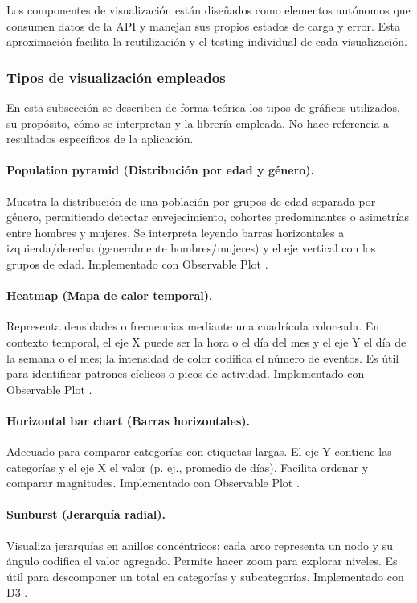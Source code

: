 Los componentes de visualización están diseñados como elementos autónomos que consumen datos de la API y manejan sus propios estados de carga y error. Esta aproximación facilita la reutilización y el testing individual de cada visualización.




\subsubsection{Tipos de visualización empleados}
En esta subsección se describen de forma teórica los tipos de gráficos utilizados, su propósito, cómo se interpretan y la librería empleada. No hace referencia a resultados específicos de la aplicación.

\paragraph{Population pyramid (Distribución por edad y género).} Muestra la distribución de una población por grupos de edad separada por género, permitiendo detectar envejecimiento, cohortes predominantes o asimetrías entre hombres y mujeres. Se interpreta leyendo barras horizontales a izquierda/derecha (generalmente hombres/mujeres) y el eje vertical con los grupos de edad. Implementado con Observable Plot \cite{populationPyramid,observableplot}.

\paragraph{Heatmap (Mapa de calor temporal).} Representa densidades o frecuencias mediante una cuadrícula coloreada. En contexto temporal, el eje X puede ser la hora o el día del mes y el eje Y el día de la semana o el mes; la intensidad de color codifica el número de eventos. Es útil para identificar patrones cíclicos o picos de actividad. Implementado con Observable Plot \cite{heatmap,observableplot}.

\paragraph{Horizontal bar chart (Barras horizontales).} Adecuado para comparar categorías con etiquetas largas. El eje Y contiene las categorías y el eje X el valor (p. ej., promedio de días). Facilita ordenar y comparar magnitudes. Implementado con Observable Plot \cite{hbarchart,observableplot}.

\paragraph{Sunburst (Jerarquía radial).} Visualiza jerarquías en anillos concéntricos; cada arco representa un nodo y su ángulo codifica el valor agregado. Permite hacer zoom para explorar niveles. Es útil para descomponer un total en categorías y subcategorías. Implementado con D3 \cite{sunburst,d3}.

